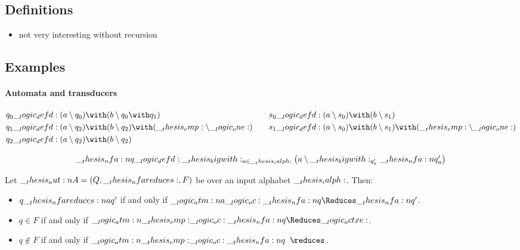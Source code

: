 \subsection{Definitions}

\begin{itemize}
\item not very interesting without recursion
\end{itemize}

\subsection{Examples}

\paragraph*{Automata and transducers}

\begin{equation*}
  \begin{lgathered}[t]
    q_0 \defd (a \limp q_0) \with (b \limp q_0 \with q_1) \\
    q_1 \defd (a \limp q_2) \with (b \limp q_2) \with (\emp \limp \one) \\
    q_2 \defd (a \limp q_2) \with (b \limp q_2)
  \end{lgathered}
  \qquad
  \begin{lgathered}[t]
    s_0 \defd (a \limp s_0) \with (b \limp s_1) \\
    s_1 \defd (a \limp s_0) \with (b \limp s_1) \with (\emp \limp \one)
  \end{lgathered}
\end{equation*}

\begin{equation*}
  \__thesis_nfa:n {q} \__logic_defd: \__thesis_bigwith:_{a \in \__thesis_ialph:} \bigl({\textstyle a \mathbin { \setminus } \__thesis_bigwith:_{q'_a} \__thesis_nfa:n {q}'_a}\bigr)
\end{equation*}

\begin{theorem}
  Let $\aut{A} = (Q, \mathord{\nfareduces}, F)$ be  over an input alphabet $\__thesis_ialph:$.
  Then:
  \begin{itemize}[nosep]
  \item $q \nfareduces[a] q'$ if and only if $\atm{a} \oc \nfa{q} \Reduces \nfa{q}'$.
  \item $q \in F$ if and only if $\atm{\emp} \oc \nfa{q} \Reduces \octxe$.
  \item $q \notin F$ if and only if $\atm{\emp} \oc \nfa{q} \longarrownot\reduces$.
  \end{itemize}
\end{theorem}


